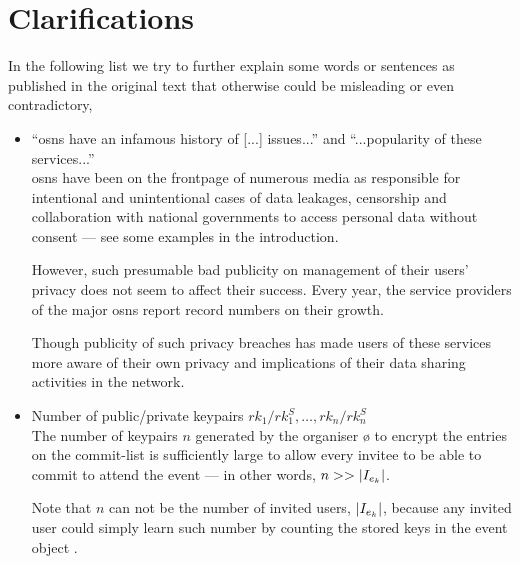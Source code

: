 

\section{Clarifications}
    \label{section:thesis:appendix:ei:clarifications}
In the following list we try to further explain some words or sentences as published 
in the original text that otherwise could be misleading or even contradictory,
\begin{itemize}
    \item ``\acp{osn} have an infamous history of [...] issues...'' 
    and ``...popularity of these services...''\\
    \Acp{osn} have been on the frontpage of numerous media as responsible for intentional 
    and unintentional cases of data leakages, censorship and collaboration with 
    national governments to access personal data without consent --- see some examples 
    in the introduction. 
    
    However, such presumable bad publicity on management of their users' privacy 
    does not seem to affect their success. Every year, the service providers of 
    the major \acp{osn} report record numbers on their growth.
    
    Though publicity of such privacy breaches has made users of these services more 
    aware of their own privacy and implications of their data sharing activities 
    in the network.
    
    \item Number of public/private keypairs $rk_1/rk_1^S, \dots, rk_n/rk_n^S$\\
    The number of keypairs $n$ generated by the organiser \o{} to encrypt the 
    entries on the commit-list is sufficiently large to allow every invitee to be 
    able to commit to attend the event \eo{} --- in other words, $n >> |\I|$.
    
    Note that $n$ can not be the number of invited users, $|\I|$, because any invited 
    user could simply learn such number by counting the stored keys in the event 
    object \eo{}. 
    
\end{itemize}

